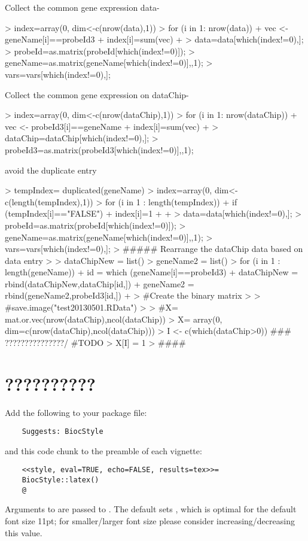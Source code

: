 \documentclass{article}
\begin{document}
Collect the common gene expression data-
\begin{Schunk}
\begin{Sinput}
> index=array(0, dim<-c(nrow(data),1))
> for (i in 1: nrow(data)){
+   vec <- geneName[i]==probeId3
+ 	index[i]=sum(vec)
+ }
> data=data[which(index!=0),];
> probeId=as.matrix(probeId[which(index!=0)]);
> geneName=as.matrix(geneName[which(index!=0)],,1);
> vars=vars[which(index!=0),];
\end{Sinput}
\end{Schunk}

Collect the common gene expression on dataChip-

\begin{Schunk}
\begin{Sinput}
> index=array(0, dim<-c(nrow(dataChip),1))
> for (i in 1: nrow(dataChip)){
+ 	vec <- probeId3[i]==geneName
+ 	index[i]=sum(vec)
+ }
> dataChip=dataChip[which(index!=0),];
> probeId3=as.matrix(probeId3[which(index!=0)],,1);
\end{Sinput}
\end{Schunk}

avoid the duplicate entry
\begin{Schunk}
\begin{Sinput}
> tempIndex= duplicated(geneName)
> index=array(0, dim<-c(length(tempIndex),1))
> for (i in 1 : length(tempIndex)){
+ 	if (tempIndex[i]=="FALSE"){
+ 		index[i]=1
+ 	}
+ }
> data=data[which(index!=0),];
> probeId=as.matrix(probeId[which(index!=0)]);
> geneName=as.matrix(geneName[which(index!=0)],,1);
> vars=vars[which(index!=0),];
> ##### Rearrange the dataChip data based on data entry
> 
> dataChipNew = list()
> geneName2 = list()
> for (i in 1 : length(geneName)){
+ 	id = which (geneName[i]==probeId3)
+ 	dataChipNew = rbind(dataChipNew,dataChip[id,])
+ 	geneName2 = rbind(geneName2,probeId3[id,])
+ }
> #Create the binary matrix
> 
> #save.image("test20130501.RData")
> 
> #X= mat.or.vec(nrow(dataChip),ncol(dataChip))
> X= array(0, dim=c(nrow(dataChip),ncol(dataChip)))
> I <- c(which(dataChip>0)) ### ???????????????/ #TODO
> X[I] = 1
> ####
\end{Sinput}
\end{Schunk}


\section{??????????}

Add the following to your package  file:
\begin{verbatim}
    Suggests: BiocStyle
\end{verbatim}
and this code chunk to the preamble of each vignette:
\begin{verbatim}
    <<style, eval=TRUE, echo=FALSE, results=tex>>=
    BiocStyle::latex()
    @ 
\end{verbatim}
Arguments to  are passed to . The default sets , which is optimal for the default font size 11pt; for smaller/larger font size please consider increasing/decreasing this value.
\end{document}
